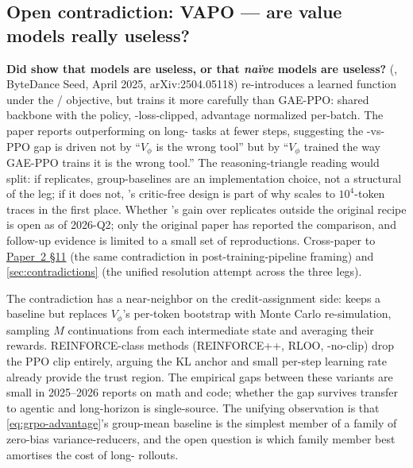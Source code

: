 \subsection{Open contradiction: VAPO --- are value models really useless?}
\label{sec:rlvr-vapo}

\begin{contradiction}
\textbf{Did  show that  models are useless, or that
\emph{na\"ive}  models are useless?}  (,
ByteDance Seed, April 2025, arXiv:2504.05118) re-introduces a learned
 function under the / objective, but trains it more
carefully than GAE-PPO: shared backbone with the policy,
-loss-clipped, advantage normalized per-batch. The paper reports
 outperforming  on long- tasks at fewer steps, suggesting
the -vs-PPO gap is driven not by ``$V_\phi$ is the wrong tool'' but
by ``$V_\phi$ trained the way GAE-PPO trains it is the wrong tool.''
The reasoning-triangle reading would split: if  replicates,
group-baselines are an implementation choice, not a structural 
of the leg; if it does not, 's critic-free design is part of why
 scales to $10^4$-token traces in the first place. Whether 's
gain over  replicates outside the original recipe is open as of
2026-Q2; only the original paper has reported the comparison, and
follow-up evidence is limited to a small set of reproductions.
Cross-paper to \hyperref[P2-sec:rlvr-grpo]{Paper~2 §11} (the same contradiction in
post-training-pipeline framing) and \cref{sec:contradictions} (the
unified resolution attempt across the three legs).
\end{contradiction}

The  contradiction has a near-neighbor on the credit-assignment
side:   keeps a  baseline but
replaces $V_\phi$'s per-token bootstrap with Monte Carlo re-simulation,
sampling $M$ continuations from each intermediate state and averaging
their rewards. REINFORCE-class methods (REINFORCE++, RLOO,
-no-clip) drop the PPO clip entirely, arguing the KL anchor and
small per-step learning rate already provide the trust region.
 The
empirical gaps between these variants are small in 2025--2026 reports
on math and code; whether the gap survives transfer to agentic and
long-horizon  is single-source. The unifying observation is that
\cref{eq:grpo-advantage}'s group-mean baseline is the simplest member
of a family of zero-bias variance-reducers, and the open question is
which family member best amortises the cost of long- rollouts.

